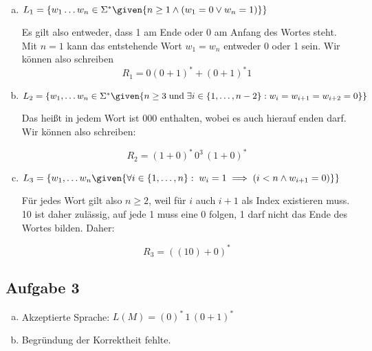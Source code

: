 \begin{enumerate}[a)]
\item $L_1 = \{ w_1 \ldots w_n \in \Sigma^{*} \given{n\geq 1 \land (w_1 = 0 \lor w_n = 1)} \} $

Es gilt also entweder, dass 1 am Ende oder 0 am Anfang des Wortes steht. Mit $n=1$ kann das entstehende Wort $w_1 = w_n$ entweder 0 oder 1 sein. Wir können also schreiben
\[ R_1 = 0 (0 + 1)^{*} + (0+1)^{*}1 \]

\item $L_2 = \{w_1, \ldots w_n \in \Sigma^{*} \given{n\geq 3 \; \text{und} \; \exists i \in \{ 1, \ldots, n-2 \} : w_i = w_{i+1} = w_{i+2} = 0 } \}$

Das heißt in jedem Wort ist 000 enthalten, wobei es auch hierauf enden darf. Wir können also schreiben:

\[ R_2 = (1+0)^{*} \, 0^3 \, (1+0)^{*} \]

\item $ L_3 = \{ w_1, \ldots w_n \given{ \forall i \in \{1, \ldots, n\}: \; w_i = 1 \implies (i<n \land w_{i+1} = 0) } \} $

Für jedes Wort gilt also $n \geq 2$, weil für $i$ auch $i+1$ als Index existieren muss. 10 ist daher zulässig, auf jede 1 muss eine 0 folgen, 1 darf nicht das Ende des Wortes bilden. Daher:

\[ R_3 = ((10) + 0)^{*} \]

\end{enumerate}

\subsection*{Aufgabe 3}

\begin{enumerate}[a)]
  \item Akzeptierte Sprache: $L(M)= (0)^{*} \, 1 \, (0 + 1)^{*}  $\\
  \item


      Begründung der Korrektheit fehlte.
\end{enumerate}



